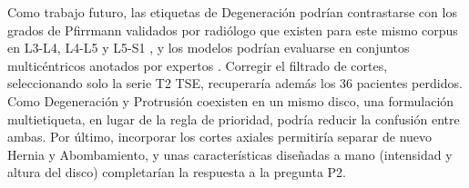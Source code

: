 Como trabajo futuro, las etiquetas de Degeneración podrían contrastarse con los grados de Pfirrmann validados por radiólogo que existen para este mismo corpus en L3-L4, L4-L5 y L5-S1 \cite{masood2026}, y los modelos podrían evaluarse en conjuntos multicéntricos anotados por expertos \cite{richards2026}. Corregir el filtrado de cortes, seleccionando solo la serie T2 TSE, recuperaría además los 36 pacientes perdidos. Como Degeneración y Protrusión coexisten en un mismo disco, una formulación multietiqueta, en lugar de la regla de prioridad, podría reducir la confusión entre ambas. Por último, incorporar los cortes axiales permitiría separar de nuevo Hernia y Abombamiento, y unas características diseñadas a mano (intensidad y altura del disco) completarían la respuesta a la pregunta P2.
